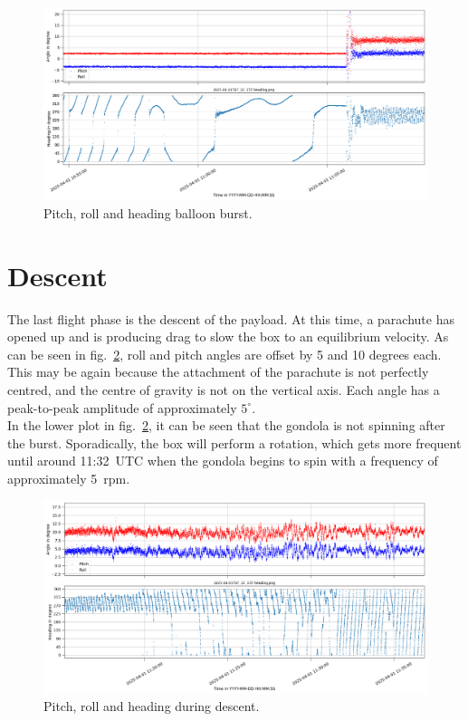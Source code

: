 \begin{figure}[H]
    \centering
    \includegraphics[width=\linewidth]{images/05_flight_data/pop_heading.png}
    \caption[Heading at balloon burst.]{Pitch, roll and heading balloon burst.}
    \label{fig:res:burst_heading}
\end{figure}


\section{Descent \label{sec:descent}}
The last flight phase is the descent of the payload. At this time, a parachute has opened up and is producing drag to slow the box to an equilibrium velocity. As can be seen in fig.~\ref{fig:res:descent_heading}, roll and pitch angles are offset by 5 and 10 degrees each. This may be again because the attachment of the parachute is not perfectly centred, and the centre of gravity is not on the vertical axis. Each angle has a peak-to-peak amplitude of approximately $5^\circ$.\\
In the lower plot in fig.~\ref{fig:res:descent_heading}, it can be seen that the gondola is not spinning after the burst. Sporadically, the box will perform a rotation, which gets more frequent until around 11:32~UTC when the gondola begins to spin with a frequency of approximately 5~rpm.

\begin{figure}[H]
    \centering
    \includegraphics[width=\linewidth]{images/05_flight_data/descend_heading.png}
    \caption[Heading during descent.]{Pitch, roll and heading during descent.}
    \label{fig:res:descent_heading}
\end{figure}